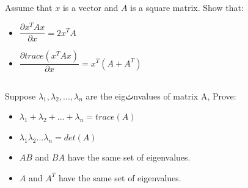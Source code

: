 \documentclass[a4paper]{article}
\begin{document}
        \subsection{}
       Assume that $x$ is a vector and $A$ is a square matrix. Show that:
        \begin{itemize}
        \item $\dfrac{\partial x^{T}Ax}{\partial x}=2x^{T}A$
        \item $\dfrac{\partial trace( x^{T}Ax)}{\partial x}=x^{T}(A+A^{T})$
        \end{itemize}

        \subsection{}
        Suppose $\lambda_{1},\lambda_{2},...,\lambda_{n}$ are the eigثnvalues of matrix A, Prove: 
                \begin{itemize}
        \item $\lambda_{1}+\lambda_{2}+...+\lambda_{n}=trace(A)$
        \item $\lambda_{1}\lambda_{2}...\lambda_{n}=det(A)$
        \item $AB$ and $BA$ have the same set of eigenvalues.
        \item $A$ and $A^{T}$ have the same set of eigenvalues.
        \end{itemize}
        	
\end{document}
